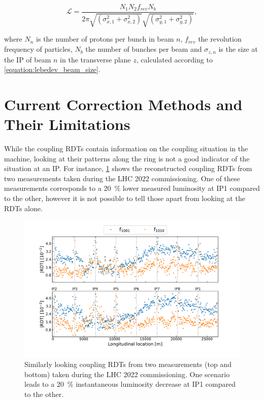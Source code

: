 \begin{equation}
    \mathcal{L} = \frac{N_1 N_2 f_{rev} N_b}{2 \pi \sqrt{\left( \sigma_{x, 1}^2 + \sigma_{x, 2}^2 \right)} \sqrt{\left( \sigma_{y, 1}^2 + \sigma_{y, 2}^2 \right)}} ,
    \label{equation:luminosity_double_beams}
\end{equation}
\vspace{1pt}

\noindent
where \(N_{n}\) is the number of protons per bunch in beam \(n\), \(f_{rev}\) the revolution frequency of particles, \(N_b\) the number of bunches per beam and \(\sigma_{z, n}\) is the size at the IP of beam \(n\) in the transverse plane \(z\), calculated according to \cref{equation:lebedev_beam_size}.

\section{Current Correction Methods and Their Limitations}
\label{section:current_correction_methods_and_their_limitations}

While the coupling \glspl{RDT} contain information on the coupling situation in the machine, looking at their patterns along the ring is not a good indicator of the situation at an \gls{IP}.
For instance, \cref{figure:guess_rdts} shows the reconstructed coupling RDTs from two measurements taken during the LHC \num{2022} commissioning.
One of these measurements corresponds to a \qty{20}{\percent} lower measured luminosity at IP\num{1} compared to the other, however it is not possible to tell those apart from looking at the RDTs alone.

\begin{figure}[!htb]
    \centering
    \includegraphics*[width=\linewidth]{Figures/IR_Coupling_Correction/similar_rdts_different_ip1_lumi.pdf}
    \caption{Similarly looking coupling RDTs from two measurements (top and bottom) taken during the LHC \num{2022} commissioning. One scenario leads to a \qty{20}{\percent} instantaneous luminosity decrease at IP\num{1} compared to the other.}
    \label{figure:guess_rdts}
\end{figure}

